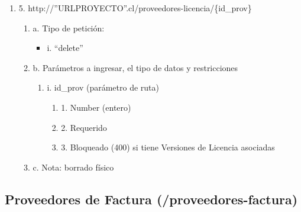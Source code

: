 \begin{enumerate}
    \item 5. http://”URLPROYECTO”.cl/proveedores-licencia/\{id\_prov\}
    \begin{enumerate}
        \item a. Tipo de petición:
            \begin{itemize}
               \item i. “delete”
            \end{itemize}
        \item b. Parámetros a ingresar, el tipo de datos y restricciones
            \begin{enumerate}
                \item i. id\_prov (parámetro de ruta)
                    \begin{enumerate}
                        \item 1. Number (entero)
                        \item 2. Requerido
                        \item 3. Bloqueado (400) si tiene Versiones de Licencia asociadas
                    \end{enumerate}
            \end{enumerate}
        \item c. Nota: borrado físico
    \end{enumerate}
\end{enumerate}

\subsection{Proveedores de Factura (/proveedores-factura)}

